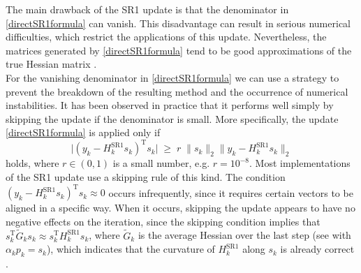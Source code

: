 The main drawback of the SR1 update is that the denominator in \cref{directSR1formula} can vanish. This disadvantage can result in serious numerical difficulties, which restrict the applications of this update. Nevertheless, the matrices generated by \cref{directSR1formula} tend to be good approximations of the true Hessian matrix \cite[p.~145]{NocedalWright:2006}. \\
For the vanishing denominator in \cref{directSR1formula} we can use a strategy to prevent the breakdown of the resulting method and the occurrence of numerical instabilities. It has been observed in practice that it performs well simply by skipping the update if the denominator is small. More specifically, the update \cref{directSR1formula} is applied only if 
\begin{equation}\label{safeguard}
    \lvert (y_k - H^\mathrm{SR1}_k s_k)^{\mathrm{T}} s_k \lvert \; \geq \; r \; \lVert s_k \rVert_2 \lVert y_k - H^\mathrm{SR1}_k s_k \rVert_2 
\end{equation}
holds, where $r \in (0, 1)$ is a small number, e.g. $r = 10^{−8}$. Most implementations of the SR1 update use a skipping rule of this kind. The condition $(y_k - H^\mathrm{SR1}_k s_k)^{\mathrm{T}} s_k \approx 0$ occurs infrequently, since it requires certain vectors to be aligned in a specific way. When it occurs, skipping the update appears to have no negative effects on the iteration, since the skipping condition implies that $s^{\mathrm{T}}_k \tilde{G}_k s_k \approx s^{\mathrm{T}}_k H^\mathrm{SR1}_k s_k$, where $\tilde{G}_k$ is the average Hessian over the last step (see \cite[(6.11)]{NocedalWright:2006} with $\alpha_k p_k = s_k$), which indicates that the curvature of $H^\mathrm{SR1}_k$ along $s_k$ is already correct \cite[p.~145-146]{NocedalWright:2006}. \\

